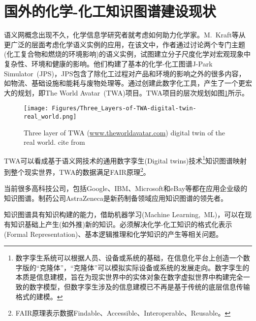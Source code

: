 \section{国外的化学-化工知识图谱建设现状}
语义网概念出现不久，化学信息学研究者就考虑如何助力化学家。\textrm{M.~Kraft}等从更广泛的层面考虑化学语义实例的应用，在该文中，作者通过讨论两个专门主题(化工复合物和燃烧的环境影响)的语义实例，试图建立分子尺度化学对宏观现象中复杂性、环境和健康的影响。他们构建了基本的化学-化工图谱\textrm{J-Park Simulator~(JPS)}，\textrm{JPS}包含了除化工过程对产品和环境的影响之外的很多内容，如物流、基础设施和能耗与废物处理等。通过创建此数字化工具，产生了一个更宏大的规划，即\textrm{The World Avatar~(TWA)}项目。\textrm{TWA}项目的层次规划如图\ref{Fig:Three_Layers-of-TWA}所示。
\begin{figure}[h!]
\centering
\texttt{[image: Figures/Three\_Layers-of-TWA-digital-twin-real\_world.png]}
\caption{\small\textrm{Three layer of TWA (\url{www.theworldavatar.com}) digital twin of the real world. cite from~\cite{ACR56-128_2023}}}%
\label{Fig:Three_Layers-of-TWA}
\end{figure}
\textrm{TWA}可以看成基于语义网技术的通用数字孪生\textrm{(Digital twins)}技术\footnote{数字孪生系统可以根据人员、设备或系统的基础，在信息化平台上创造一个数字版的“克隆体”，“克隆体”可以模拟实际设备或系统的发展走向。数字孪生的本质是信息建模，旨在为现实世界中的实体对象在数字虚拟世界中构建完全一致的数字模型，但数字孪生涉及的信息建模已不再是基于传统的底层信息传输格式的建模。}知识图谱映射到整个现实世界，\textrm{TWA}的数据满足\textrm{FAIR}原理\footnote{\textrm{FAIR}原理表示数据\textrm{Findable}、\textrm{Accessible}、\textrm{Interoperable}、\textrm{Reusable}。}。

当前很多高科技公司，包括\textrm{Google}、\textrm{IBM}、\textrm{Microsoft}和\textrm{eBay}等都在应用企业级的知识图谱。制药公司\textrm{AstraZeneca}是新药制备领域应用知识图谱的领先者。

知识图谱具有知识构建的能力，借助机器学习\textrm{(Machine Learning,~ML)}，可以在现有知识基础上产生(如外推)新的知识。必须解决化学-化工知识的格式化表示\textrm{(Formal Representation)}、基本逻辑推理和化学知识的产生等相关问题。
